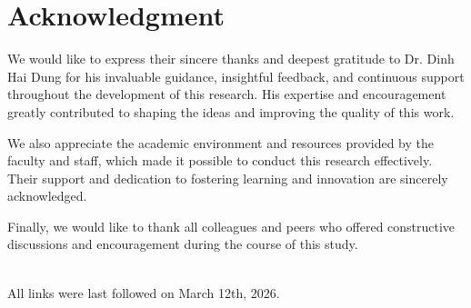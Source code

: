 \documentclass[conference,a4paper,english]{IEEEtran}[2015/08/26]
\begin{document}








 

\section*{Acknowledgment}

We would like to express their sincere thanks and deepest gratitude to Dr. Dinh Hai Dung for his invaluable guidance, insightful feedback, and continuous support throughout the development of this research. His expertise and encouragement greatly contributed to shaping the ideas and improving the quality of this work.

We also appreciate the academic environment and resources provided by the faculty and staff, which made it possible to conduct this research effectively. Their support and dedication to fostering learning and innovation are sincerely acknowledged.

Finally, we would like to thank all colleagues and peers who offered constructive discussions and encouragement during the course of this study.






\ \\
%
\noindent
All links were last followed on March 12th, 2026.
\end{document}
